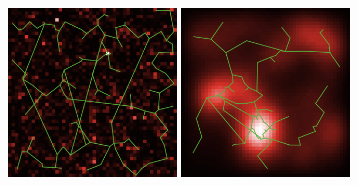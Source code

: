 \begin{figure}
\begin{subfigure}[t]{0.45\linewidth}
   \includegraphics[width=0.49\textwidth]{figures/configs/3_param71918_seed0}
   \includegraphics[width=0.49\textwidth]{figures/configs/4_param71945_seed0}
   \caption{}
\end{subfigure}


\end{figure}

